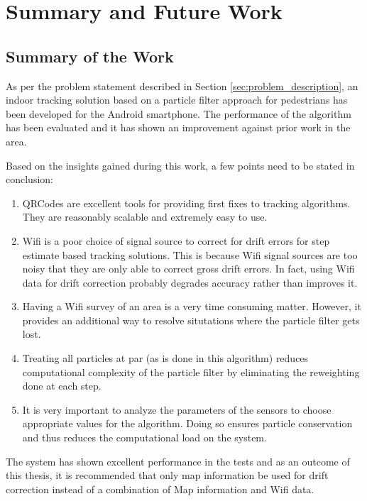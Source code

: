 \chapter{Summary and Future Work\label{chap:summary}}

\section{Summary of the Work}

As per the problem statement described in Section \ref{sec:problem_description},
an indoor tracking solution based on a particle filter approach for pedestrians
has been developed for the Android smartphone. The performance of the algorithm 
has been evaluated and it has shown an improvement against prior work in the 
area.

Based on the insights gained during this work, a few points need to be stated
in conclusion:

\begin{enumerate}
\item QRCodes are excellent tools for providing first fixes to tracking algorithms. They are reasonably scalable
    and extremely easy to use.
\item Wifi is a poor choice of signal source to correct for drift errors for step estimate based tracking solutions. This is because Wifi signal sources are too noisy that they are only able to correct gross drift errors. In fact, using Wifi data for drift correction probably degrades accuracy rather than improves it. 
\item Having a Wifi survey of an area is a very time consuming matter. However, it provides an additional way to resolve situtations where the particle filter gets lost. 
\item Treating all particles at par (as is done in this algorithm) reduces computational complexity of the particle filter by eliminating the reweighting done at each step.
\item It is very important to analyze the parameters of the sensors to choose appropriate values for the algorithm. Doing so ensures particle conservation and thus reduces the computational load on the system.
\end{enumerate}

The system has shown excellent performance in the tests and as an outcome of this thesis, it is recommended that only map information be used for drift correction instead of a combination of Map information and Wifi data. 

